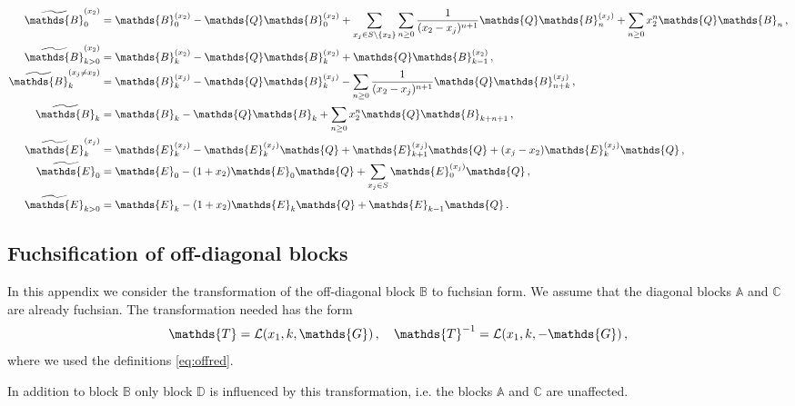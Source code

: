 \documentclass[12pt]{article}
\numberwithin{equation}{section}
\numberwithin{figure}{section}
\newcommand{\A}{\mathds{A}}
\newcommand{\B}{\mathds{B}}
\newcommand{\C}{\mathds{C}}
\newcommand{\D}{\mathds{D}}
\newcommand{\E}{\mathds{E}}
\newcommand{\G}{\mathds{G}}
\newcommand{\T}{\mathds{T}}
\newcommand{\Q}{\mathds{Q}}
\begin{document}
      \begin{align*}
        \widetilde \B^{(x_2)}_0 &=
          \B^{(x_2)}_0 - \Q \B^{(x_2)}_0
          +
          \sum\limits_{x_j \in S \backslash\{x_2\}} 
          \sum\limits_{n\geq0} \frac1{(x_2-x_j)^{n+1}}
          \Q \B^{(x_j)}_n  
          + 
          \sum\limits_{n\geq0} 
          x_2^n 
          \Q \B_n\,,
        \\
        \widetilde \B^{(x_2)}_{k>0} &=
          \B^{(x_2)}_k - \Q \B^{(x_2)}_k 
          +
          \Q \B^{(x_2)}_{k-1}\,, 
        \\
        \widetilde \B^{(x_j\neq x_2)}_k &=
          \B^{(x_j)}_k - \Q \B^{(x_j)}_k 
          - 
          \sum\limits_{n\geq0} 
          \frac1{(x_2-x_j)^{n+1}} 
          \Q \B^{(x_j)}_{n+k}\,, 
        \\
        \widetilde \B_k &=
          \B_k - \Q \B_k 
          +
          \sum\limits_{n\geq0} 
          x_2^n 
          \Q \B_{k+n+1} \,,
        \\
        \widetilde \E^{(x_j)}_k &=
          \E^{(x_j)}_k - \E^{(x_j)}_k \Q 
          +
          \E^{(x_j)}_{k+1} \Q 
          +
          (x_j-x_2)
          \E^{(x_j)}_k \Q \,,  
        \\
        \widetilde \E_0 &=
          \E_0 - (1+x_2) \E_0 \Q 
          +
          \sum\limits_{x_j \in S} 
          \E^{(x_j)}_0 \Q \,, \\
        \widetilde \E_{k>0} &=
          \E_k - (1+x_2)\E_k \Q 
          +
          \E_{k-1} \Q\,. 
      \end{align*}
    \subsection{Fuchsification of off-diagonal blocks}
      In this appendix we consider the transformation of the off-diagonal block $\B$ to fuchsian form.
      We assume that the diagonal blocks $\A$ and $\C$ are already fuchsian.
      The transformation needed has the form
      \begin{equation} \label{eq:lefttrans}
        \T = {\cal L}(x_1,k,\G)\,, \quad
        \T^{-1} = {\cal L}(x_1,k,-\G)\,,
      \end{equation}
      where we used the definitions \eqref{eq:offred}. 

      In addition to block $\B$ only block $\D$ is influenced by this transformation, i.e. the blocks $\A$ and $\C$ are unaffected.
      
\end{document}

